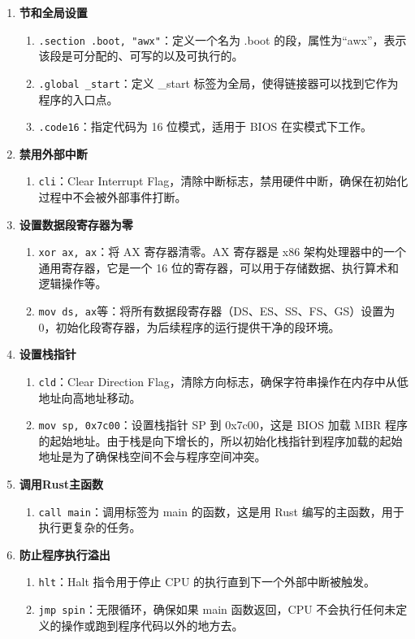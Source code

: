 \begin{enumerate}
    \item \textbf{节和全局设置}
          \begin{enumerate}
              \item \texttt{.section .boot, "awx"}：定义一个名为 .boot 的段，属性为“awx”，表示该段是可分配的、可写的以及可执行的。
              \item \texttt{.global \_start}：定义 \_start 标签为全局，使得链接器可以找到它作为程序的入口点。
              \item \texttt{.code16}：指定代码为 16 位模式，适用于 BIOS 在实模式下工作。
          \end{enumerate}
    \item \textbf{禁用外部中断}
          \begin{enumerate}
              \item \texttt{cli}：Clear Interrupt Flag，清除中断标志，禁用硬件中断，确保在初始化过程中不会被外部事件打断。
          \end{enumerate}
    \item \textbf{设置数据段寄存器为零}
          \begin{enumerate}
              \item \texttt{xor ax, ax}：将 AX 寄存器清零。AX 寄存器是 x86 架构处理器中的一个通用寄存器，它是一个 16 位的寄存器，可以用于存储数据、执行算术和逻辑操作等。
              \item \texttt{mov ds, ax}等：将所有数据段寄存器（DS、ES、SS、FS、GS）设置为 0，初始化段寄存器，为后续程序的运行提供干净的段环境。
          \end{enumerate}
    \item \textbf{设置栈指针}
          \begin{enumerate}
              \item \texttt{cld}：Clear Direction Flag，清除方向标志，确保字符串操作在内存中从低地址向高地址移动。
              \item \texttt{mov sp, 0x7c00}：设置栈指针 SP 到 0x7c00，这是 BIOS 加载 MBR 程序的起始地址。由于栈是向下增长的，所以初始化栈指针到程序加载的起始地址是为了确保栈空间不会与程序空间冲突。
          \end{enumerate}
    \item \textbf{调用Rust主函数}
          \begin{enumerate}
              \item \texttt{call main}：调用标签为 main 的函数，这是用 Rust 编写的主函数，用于执行更复杂的任务。
          \end{enumerate}
    \item \textbf{防止程序执行溢出}
          \begin{enumerate}
              \item \texttt{hlt}：Halt 指令用于停止 CPU 的执行直到下一个外部中断被触发。
              \item \texttt{jmp spin}：无限循环，确保如果 main 函数返回，CPU 不会执行任何未定义的操作或跑到程序代码以外的地方去。
          \end{enumerate}
\end{enumerate}

